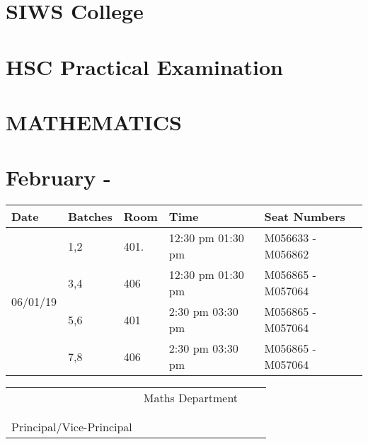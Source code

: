 \documentclass[14pt]{extarticle}
\begin{document}
\section*{SIWS College}
\section*{HSC Practical Examination }
\section*{MATHEMATICS}
\section*{February - \the\year }
\begin{tabular}{ | m{2.5cm} | m{1.8cm}|m{1.4cm}| m{4.6cm} |  m{5cm} | } 
  \hline
  
  Date
  &Batches
  &Room
  &Time
  & Seat Numbers \\ 
   
  \hline
  \multirow{4}{*}{06/01/19 }
  &1,2
  &401.
  &12:30 pm 01:30 pm 
  &M056633 - M056862 
  \\\cline{2-5}
  
  & 3,4
  &406
  & 12:30 pm 01:30 pm
  & M056865 - M057064 
  \\\cline{2-5}
  
  & 5,6
  &401
  & 2:30 pm 03:30 pm
  & M056865 - M057064 
  \\\cline{2-5}
  
  & 7,8
  &406
  & 2:30 pm 03:30 pm
  & M056865 - M057064
  \\ 
  \hline





   

\end{tabular}
\vspace{1cm}

\vspace{2.1cm}

\begin{tabu} to 1\textwidth {X[l] X[r]}
  & Maths Department\ \ \ \  \\
 \\ \\ 
  Principal/Vice-Principal&
\end{tabu}
\end{document}
